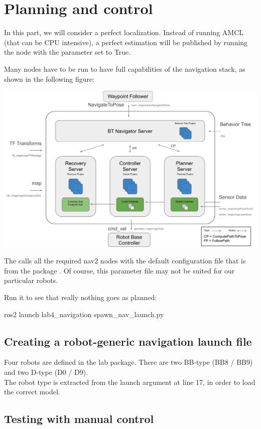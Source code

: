 \documentclass{ecnreport}
\begin{document}
\section{Planning and control}

In this part, we will consider a perfect localization. Instead of running AMCL (that can be CPU intensive), a perfect estimation 
will be published by running the  node with the parameter  set to True.

Many nodes have to be run to have full capabilities of the navigation stack, as shown in the following figure:
\begin{center}
 \includegraphics[width=.7\linewidth]{nav2_architectural_diagram}
\end{center}

The  calls all the required nav2 nodes with the default configuration file that is  from the package . Of course, this parameter file may not be suited for our particular robots.

Run it to see that really nothing goes as planned:
\begin{bashcodelarge}
 ros2 launch lab4_navigation spawn_nav_launch.py
\end{bashcodelarge}

\subsection{Creating a robot-generic navigation launch file}

Four robots are defined in the lab package. There are two BB-type (BB8 / BB9) and two D-type (D0 / D9).\\
The robot type is extracted from the  launch argument at line 17, in order to load the correct model.

\subsection{Testing with manual control}
\end{document}

